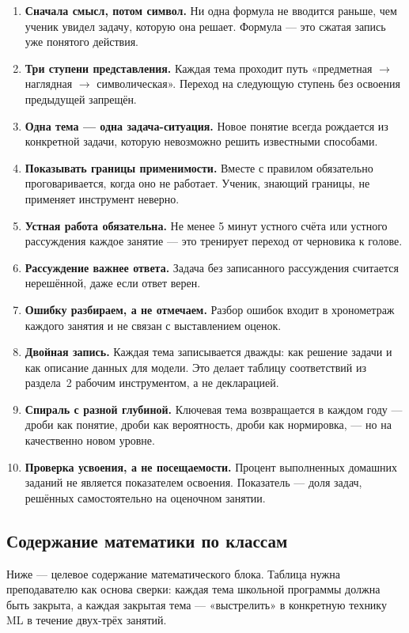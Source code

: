 \documentclass[12pt,a4paper]{article}
\begin{document}
\begin{enumerate}
  \item \textbf{Сначала смысл, потом символ.} Ни одна формула не
  вводится раньше, чем ученик увидел задачу, которую она решает.
  Формула --- это сжатая запись уже понятого действия.
  \item \textbf{Три ступени представления.} Каждая тема проходит
  путь «предметная $\rightarrow$ наглядная $\rightarrow$ символическая».
  Переход на следующую ступень без освоения предыдущей запрещён.
  \item \textbf{Одна тема --- одна задача-ситуация.} Новое понятие
  всегда рождается из конкретной задачи, которую невозможно решить
  известными способами.
  \item \textbf{Показывать границы применимости.} Вместе с правилом
  обязательно проговаривается, когда оно не работает. Ученик,
  знающий границы, не применяет инструмент неверно.
  \item \textbf{Устная работа обязательна.} Не менее 5 минут устного
  счёта или устного рассуждения каждое занятие --- это тренирует
  переход от черновика к голове.
  \item \textbf{Рассуждение важнее ответа.} Задача без записанного
  рассуждения считается нерешённой, даже если ответ верен.
  \item \textbf{Ошибку разбираем, а не отмечаем.} Разбор ошибок
  входит в хронометраж каждого занятия и не связан с выставлением
  оценок.
  \item \textbf{Двойная запись.} Каждая тема записывается дважды:
  как решение задачи и как описание данных для модели. Это делает
  таблицу соответствий из раздела~2 рабочим инструментом, а не
  декларацией.
  \item \textbf{Спираль с разной глубиной.} Ключевая тема возвращается
  в каждом году --- дроби как понятие, дроби как вероятность, дроби
  как нормировка, --- но на качественно новом уровне.
  \item \textbf{Проверка усвоения, а не посещаемости.} Процент
  выполненных домашних заданий не является показателем освоения.
  Показатель --- доля задач, решённых самостоятельно на оценочном занятии.
\end{enumerate}

\subsection{Содержание математики по классам}

Ниже --- целевое содержание математического блока. Таблица нужна
преподавателю как основа сверки: каждая тема школьной программы
должна быть закрыта, а каждая закрытая тема --- «выстрелить» в
конкретную технику ML в течение двух-трёх занятий.
\end{document}
